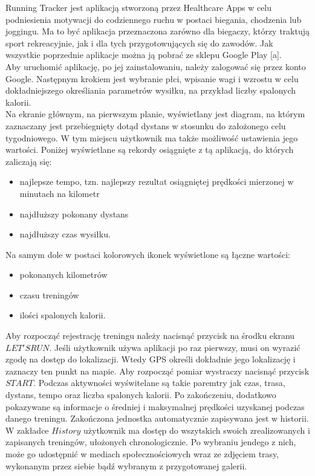 \documentclass[a4paper,12pt,reqno]{article}
\begin{document}
Running Tracker jest aplikacją stworzoną przez Healthcare Apps w celu podniesienia motywacji do codziennego ruchu w postaci biegania, chodzenia lub joggingu. Ma to być aplikacja przeznaczona zarówno dla biegaczy, którzy traktują sport rekreacyjnie, jak i dla tych przygotowujących się do zawodów. Jak wszystkie poprzednie aplikacje można ją pobrać ze sklepu Google Play [a].\\

Aby uruchomić aplikację, po jej zainstalowaniu, należy zalogować się przez konto Google. Następnym krokiem jest wybranie płci, wpisanie wagi i wzrostu w celu dokładniejszego określiania parametrów wysiłku, na przykład liczby spalonych kalorii.\\

Na ekranie głównym, na pierwszym planie, wyświetlany jest diagram, na którym zaznaczany jest przebiegnięty dotąd dystans w stosunku do założonego celu tygodniowego. W tym miejscu użytkownik ma także możliwość ustawienia jego wartości. Poniżej wyświetlane są rekordy osiągnięte z tą aplikacją, do których zaliczają się:
\begin{itemize}
	\item najlepsze tempo, tzn. najlepszy rezultat osiągniętej prędkości mierzonej w minutach na kilometr
	\item najdłuższy pokonany dystans
	\item najdłuższy czas wysiłku.
\end{itemize}
Na samym dole w postaci kolorowych ikonek wyświetlone są łączne wartości:
\begin{itemize}
	\item pokonanych kilometrów
	\item czasu treningów
	\item ilości spalonych kalorii.	
\end{itemize}
Aby rozpocząć rejestrację treningu należy nacisnąć przycisk na środku ekranu $LET'S RUN$. Jeśli użytkownik używa aplikacji po raz pierwszy, musi on wyrazić zgodę na dostęp do lokalizacji. Wtedy GPS określi dokładnie jego lokalizację i zaznaczy ten punkt na mapie. Aby rozpocząć pomiar wystraczy nacisnąć przycisk $START$. Podczas aktywności wyświtelane są takie paremtry jak czas, trasa, dystans, tempo oraz liczba spalonych kalorii. Po zakończeniu, dodatkowo pokazywane są informacje o średniej i maksymalnej prędkości uzyskanej podczas danego treningu. Zakończona jednostka automatycznie zapisywana jest w historii.\\

W zakładce $History$ użytkownik ma dostęp do wszytskich swoich zrealizowanych i zapisanych treningów, ułożonych chronologicznie. Po wybraniu jendego z nich, może go udostępnić w mediach społecznościowych wraz ze zdjęciem trasy, wykonanym przez siebie bądź wybranym z przygotowanej galerii.\\
\end{document}
